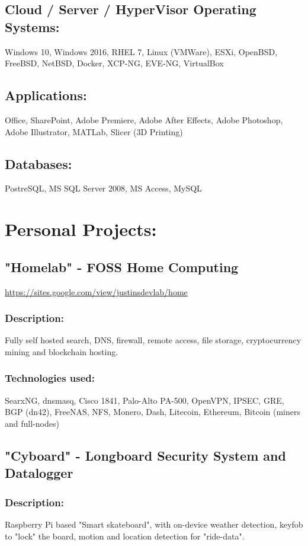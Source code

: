 \documentclass[letter,10pt]{article}
\begin{document}
\subsection*{Cloud / Server / HyperVisor Operating Systems:}
\label{sec:orgfd47a8d}
Windows 10, Windows 2016, RHEL 7, Linux  (VMWare), ESXi, OpenBSD, FreeBSD, NetBSD, Docker, XCP-NG, EVE-NG, VirtualBox
\subsection*{Applications:}
\label{sec:org70e681e}
Office, SharePoint, Adobe Premiere, Adobe After Effects, Adobe Photoshop, Adobe Illustrator, MATLab, Slicer (3D Printing)
\subsection*{Databases:}
\label{sec:org578e2ba}
PostreSQL, MS SQL Server 2008, MS Access, MySQL
\section*{Personal Projects:}
\label{sec:orgf3aec39}
\subsection*{"Homelab" - FOSS Home Computing}
\label{sec:org9fb7b04}
\url{https://sites.google.com/view/justinsdevlab/home}
\subsubsection*{Description:}
\label{sec:org00e9ab8}
Fully self hosted search, DNS, firewall, remote access, file storage, cryptocurrency mining and blockchain hosting.
\subsubsection*{Technologies used:}
\label{sec:org37f4cf2}
SearxNG, dnsmasq, Cisco 1841, Palo-Alto PA-500, OpenVPN, IPSEC, GRE, BGP (dn42), FreeNAS, NFS, Monero, Dash, Litecoin, Ethereum, Bitcoin (miners and full-nodes)

\subsection*{"Cyboard" - Longboard Security System and Datalogger}
\label{sec:org2b30bb3}
\subsubsection*{Description:}
\label{sec:org5bb529c}
Raspberry Pi based "Smart skateboard", with on-device weather detection, keyfob to "lock" the board, motion and location detection for "ride-data".
\end{document}
